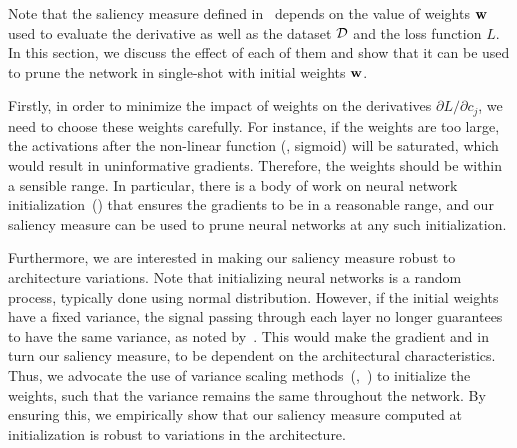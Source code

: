 Note that the saliency measure defined in~ depends on the value of weights ${\mathbf{w}}$ used to evaluate the derivative as well as the dataset ${\mathcal{D}}$ and the loss function $L$.
In this section, we discuss the effect of each of them and show that it can be used to prune the network in single-shot with initial weights ${\mathbf{w}}$. 

Firstly, in order to minimize the impact of weights on the derivatives $\partial L / \partial c_j$, we need to choose these weights carefully.
For instance, if the weights are too large, the activations after the non-linear function (\eg, sigmoid) will be saturated, which would result in uninformative gradients.
Therefore, the weights should be within a sensible range.
In particular, there is a body of work on neural network initialization~(\cite{goodfellow2016deep}) that ensures the gradients to be in a reasonable range, and our saliency measure can be used to prune neural networks at any such initialization. 

Furthermore, we are interested in making our saliency measure robust to architecture variations.
Note that initializing neural networks is a random process, typically done using normal distribution.
However, if the initial weights have a fixed variance, the signal passing through each layer no longer guarantees to have the same variance, as noted by~\cite{LeCun1998fficient}.
This would make the gradient and in turn our saliency measure, to be dependent on the architectural characteristics.
Thus, we advocate the use of variance scaling methods~(\eg,~\cite{glorot2010understanding}) to initialize the weights, such that the variance remains the same throughout the network. 
By ensuring this, we empirically show that our saliency measure computed at initialization is robust to variations in the architecture.

